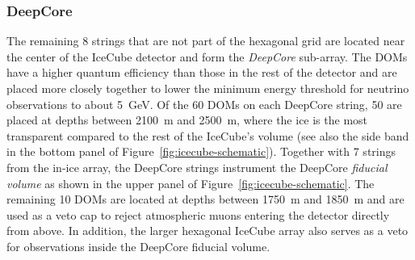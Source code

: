 \subsubsection{DeepCore}
The remaining 8 strings that are not part of the hexagonal grid are located near the center of the IceCube detector and form the \emph{DeepCore} sub-array. 
The DOMs have a higher quantum efficiency than those in the rest of the detector and are placed more closely together to lower the minimum energy threshold for neutrino observations to about 5~GeV. Of the 60 DOMs on each DeepCore string, 50 are placed at depths between 2100~m and 2500~m, where the ice is the most transparent compared to the rest of the IceCube's volume (see also the side band in the bottom panel of Figure~\ref{fig:icecube-schematic}). Together with 7 strings from the in-ice array, the DeepCore strings instrument the DeepCore \emph{fiducial volume} as shown in the upper panel of Figure~\ref{fig:icecube-schematic}.
The remaining 10 DOMs are located at depths between 1750~m and 1850~m and are used as a veto cap to reject atmospheric muons entering the detector directly from above. In addition, the larger hexagonal IceCube array also serves as a veto for observations inside the DeepCore fiducial volume.
